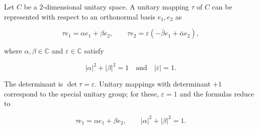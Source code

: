 Let $C$ be a 2-dimensional unitary space. A unitary mapping $\tau$ of $C$ can be represented with respect to an orthonormal basis $e_1, e_2$ as

$$\tau e_1 = \alpha e_1 + \beta e_2, \qquad \tau e_2 = \varepsilon \left( -\bar{\beta} e_1 + \bar{\alpha} e_2 \right),$$

where $\alpha, \beta \in \mathbb{C}$ and $\varepsilon \in \mathbb{C}$ satisfy

$$|\alpha|^2 + |\beta|^2 = 1 \quad \text{and} \quad |\varepsilon| = 1.$$

The determinant is $\det \tau = \varepsilon$. Unitary mappings with determinant $+1$ correspond to the special unitary group; for these, $\varepsilon = 1$ and the formulas reduce to

$$\tau e_1 = \alpha e_1 + \beta e_2, \qquad |\alpha|^2 + |\beta|^2 = 1.$$

